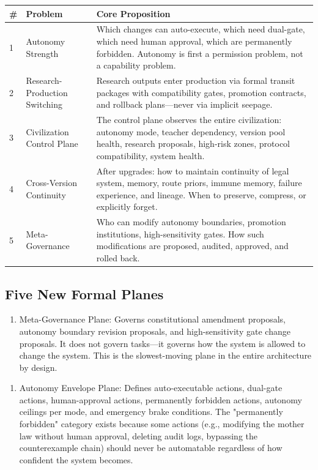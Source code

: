 \documentclass[12pt,a4paper]{article}
\begin{document}
\begin{table}[htbp]
\centering
\small
\begin{tabular}{lll}
\toprule
\# & Problem & Core Proposition \\
\midrule
1 & Autonomy Strength & Which changes can auto-execute, which need dual-gate, which need human approval, which are permanently forbidden. Autonomy is first a permission problem, not a capability problem. \\
2 & Research-Production Switching & Research outputs enter production via formal transit packages with compatibility gates, promotion contracts, and rollback plans---never via implicit seepage. \\
3 & Civilization Control Plane & The control plane observes the entire civilization: autonomy mode, teacher dependency, version pool health, research proposals, high-risk zones, protocol compatibility, system health. \\
4 & Cross-Version Continuity & After upgrades: how to maintain continuity of legal system, memory, route priors, immune memory, failure experience, and lineage. When to preserve, compress, or explicitly forget. \\
5 & Meta-Governance & Who can modify autonomy boundaries, promotion institutions, high-sensitivity gates. How such modifications are proposed, audited, approved, and rolled back. \\
\bottomrule
\end{tabular}
\end{table}


\subsection{Five New Formal Planes}


\begin{enumerate}
  \item Meta-Governance Plane: Governs constitutional amendment proposals, autonomy boundary revision proposals, and high-sensitivity gate change proposals. It does not govern tasks---it governs how the system is allowed to change the system. This is the slowest-moving plane in the entire architecture by design.
\end{enumerate}

\begin{enumerate}
  \item Autonomy Envelope Plane: Defines auto-executable actions, dual-gate actions, human-approval actions, permanently forbidden actions, autonomy ceilings per mode, and emergency brake conditions. The "permanently forbidden" category exists because some actions (e.g., modifying the mother law without human approval, deleting audit logs, bypassing the counterexample chain) should never be automatable regardless of how confident the system becomes.
\end{enumerate}
\end{document}
